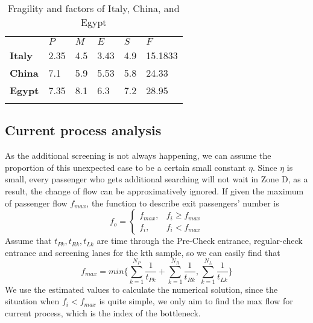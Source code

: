 \documentclass{mcmthesis}
\newlength\savedwidth
\newcommand\whline{\noalign{\global\savedwidth\arrayrulewidth
		\global\arrayrulewidth 1.2pt}%
	\hline
	\noalign{\global\arrayrulewidth\savedwidth}}
\newlength\savewidth
\newcommand\shline{\noalign{\global\savewidth\arrayrulewidth
		\global\arrayrulewidth 1.2pt}%
	\hline
	\noalign{\global\arrayrulewidth\savewidth}}
\begin{document}
	\begin{table}[htbp]
		\renewcommand\arraystretch{1.5}
		\footnotesize
		\centering
		\begin{tabular}{m{2cm}<{\centering}|m{2cm}<{\centering}|m{2cm}<{\centering}|m{2cm}<{\centering}|m{2cm}<{\centering}|m{2cm}<{\centering}}
			\whline
			&\textbf{$P$}&\textbf{$M$}&\textbf{$E$}&\textbf{$S$}&\textbf{$F$}\\
			\whline
			\textbf{Italy}& 2.35 & 4.5 & 3.43 & 4.9 & 15.1833\\
			
			\textbf{China}& 7.1 & 5.9 & 5.53 & 5.8 & 24.33\\
			
			\textbf{Egypt}& 7.35 & 8.1 & 6.3 & 7.2 & 28.95\\
			
			\shline
		\end{tabular}
		\caption{Fragility and factors of Italy, China, and Egypt}\label{tab:Fragility and factors of Italy, China, and Egypt}
	\end{table}
	
	
	\subsection{Current process analysis}
	As the additional screening is not always happening, we can assume the proportion of this unexpected case to be a certain small constant $\eta$. Since $\eta$ is small, every passenger who gets additional searching will not wait in Zone D, as a result, the change of flow can be approximatively ignored. If given the maximum of passenger flow $f_{max}$, the function to describe exit passengers' number is
	\begin{equation}
	f_{o}=
	\begin{cases}
	f_{max}, &\mbox{$f_i \geq f_{max}$}\\
	f_i, &\mbox{$f_i < f_{max}$}
	\end{cases}
	\end{equation}
	Assume that $t_{Pk}, t_{Rk}, t_{Lk}$ are time through the Pre-Check entrance, regular-check entrance and screening lanes for the kth sample, so we can easily find that 
	$$f_{max}=min\{\sum_{k=1}^{N_P}\frac{1}{t_{Pk}}+\sum_{k=1}^{N_R}\frac{1}{t_{Rk}},\sum_{k=1}^{N_L}\frac{1}{t_{Lk}}\}$$
	We use the estimated values to calculate the numerical solution, since the situation when $f_i<f_{max}$ is quite simple, we only aim to find the max flow for current process, which is the index of the bottleneck.
	
\end{document}
